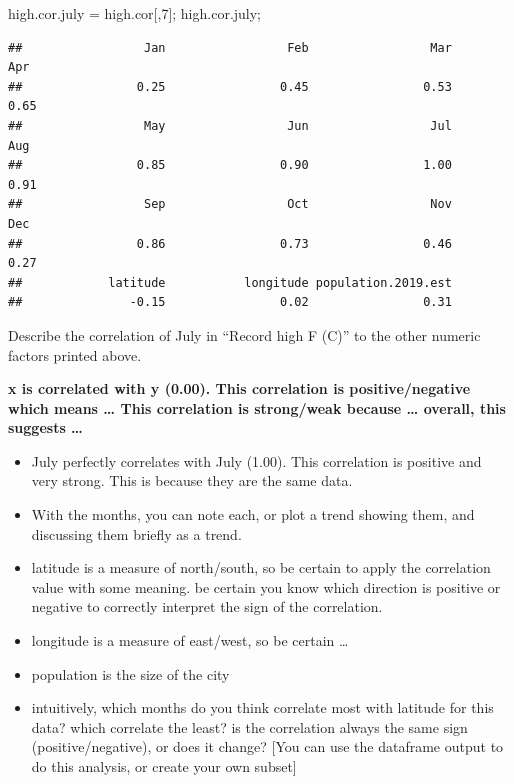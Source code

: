 \documentclass[
]{article}
\newenvironment{Shaded}{\begin{snugshade}}{\end{snugshade}}
\newcommand{\DecValTok}[1]{\textcolor[rgb]{0.00,0.00,0.81}{#1}}
\newcommand{\NormalTok}[1]{#1}
\newcommand{\StringTok}[1]{\textcolor[rgb]{0.31,0.60,0.02}{#1}}
\begin{document}
\begin{Shaded}
\begin{Highlighting}[]
\NormalTok{high.cor.july =}\StringTok{ }\NormalTok{high.cor[,}\DecValTok{7}\NormalTok{];}
\NormalTok{high.cor.july;}
\end{Highlighting}
\end{Shaded}

\begin{verbatim}
##                 Jan                 Feb                 Mar                 Apr 
##                0.25                0.45                0.53                0.65 
##                 May                 Jun                 Jul                 Aug 
##                0.85                0.90                1.00                0.91 
##                 Sep                 Oct                 Nov                 Dec 
##                0.86                0.73                0.46                0.27 
##            latitude           longitude population.2019.est 
##               -0.15                0.02                0.31
\end{verbatim}

Describe the correlation of July in ``Record high F (C)'' to the other
numeric factors printed above.

\textbf{x is correlated with y (0.00). This correlation is
positive/negative which means \ldots{} This correlation is strong/weak
because \ldots{} overall, this suggests \ldots{} }

\begin{itemize}
\item
  July perfectly correlates with July (1.00). This correlation is
  positive and very strong. This is because they are the same data.
\item
  With the months, you can note each, or plot a trend showing them, and
  discussing them briefly as a trend.
\item
  latitude is a measure of north/south, so be certain to apply the
  correlation value with some meaning. be certain you know which
  direction is positive or negative to correctly interpret the sign of
  the correlation.
\item
  longitude is a measure of east/west, so be certain \ldots{}
\item
  population is the size of the city
\item
  intuitively, which months do you think correlate most with latitude
  for this data? which correlate the least? is the correlation always
  the same sign (positive/negative), or does it change? {[}You can use
  the dataframe output to do this analysis, or create your own subset{]}
\end{itemize}
\end{document}
